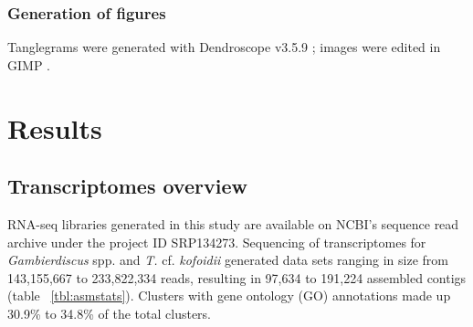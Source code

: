 \documentclass[12pt]{article}
\begin{document}


\subsubsection*{Generation of figures}
Tanglegrams were generated with Dendroscope v3.5.9 \cite{huson2007dendroscope}; images were edited in GIMP \cite{gimp}.

\newpage
\section{Results}
\subsection*{Transcriptomes overview}
RNA-seq libraries generated in this study are available on NCBI's sequence read archive under the project ID SRP134273.
Sequencing of transcriptomes for \emph{Gambierdiscus} spp. and \emph{T.} cf. \emph{kofoidii} generated data sets ranging in size from 143,155,667 to 233,822,334 reads, resulting in 97,634 to 191,224 assembled contigs (table ~\ref{tbl:asmstats}). 
Clusters with gene ontology (GO) annotations made up 30.9\% to 34.8\% of the total clusters. 
\end{document}
